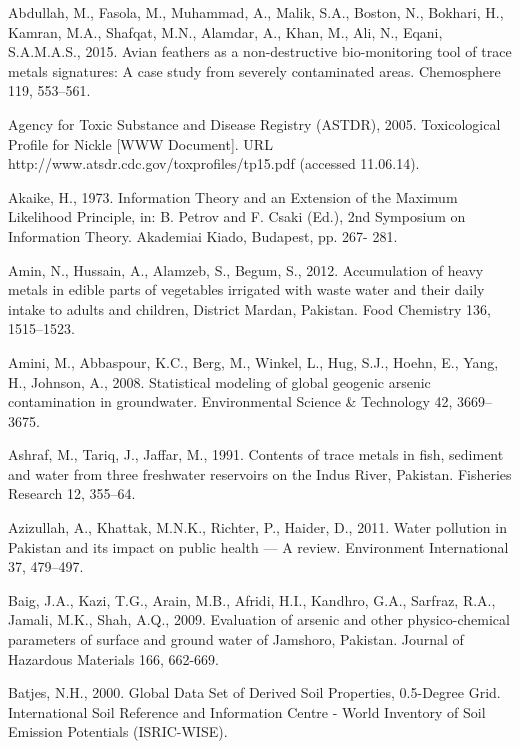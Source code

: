 \begin{thebibliography}

\bibitem{} \hangindent=1cm Abdullah, M., Fasola, M., Muhammad, A., Malik, S.A., Boston, N., Bokhari, H., Kamran, M.A., Shafqat, M.N., Alamdar, A., Khan, M., Ali, N., Eqani, S.A.M.A.S., 2015. Avian feathers as a non-destructive bio-monitoring tool of trace metals signatures: A case study from severely contaminated areas. Chemosphere 119, 553–561.

\bibitem{} \hangindent=1cm Agency for Toxic Substance and Disease Registry (ASTDR), 2005. Toxicological Profile for Nickle [WWW Document]. URL http://www.atsdr.cdc.gov/toxprofiles/tp15.pdf (accessed 11.06.14).

\bibitem{} \hangindent=1cm Akaike, H., 1973. Information Theory and an Extension of the Maximum Likelihood Principle, in: B. Petrov and F. Csaki (Ed.), 2nd Symposium on Information Theory. Akademiai Kiado, Budapest, pp. 267- 281.

\bibitem{} \hangindent=1cm Amin, N., Hussain, A., Alamzeb, S., Begum, S., 2012. Accumulation of heavy metals in edible parts of vegetables irrigated with waste water and their daily intake to adults and children, District Mardan, Pakistan. Food Chemistry 136, 1515–1523. 

\bibitem{} \hangindent=1cm Amini, M., Abbaspour, K.C., Berg, M., Winkel, L., Hug, S.J., Hoehn, E., Yang, H., Johnson, A., 2008. Statistical modeling of global geogenic arsenic contamination in groundwater. Environmental Science \& Technology 42, 3669–3675.

\bibitem{} \hangindent=1cm Ashraf, M., Tariq, J., Jaffar, M., 1991. Contents of trace metals in fish, sediment and water from three freshwater reservoirs on the Indus River, Pakistan. Fisheries Research 12, 355–64.

\bibitem{} \hangindent=1cm Azizullah, A., Khattak, M.N.K., Richter, P., Haider, D., 2011. Water pollution in Pakistan and its impact on public health — A review. Environment International 37, 479–497.

\bibitem{} \hangindent=1cm Baig, J.A., Kazi, T.G., Arain, M.B., Afridi, H.I., Kandhro, G.A., Sarfraz, R.A., Jamali, M.K., Shah, A.Q., 2009. Evaluation of arsenic and other physico-chemical parameters of surface and ground water of Jamshoro, Pakistan. Journal of Hazardous Materials 166, 662-669.

\bibitem{} \hangindent=1cm Batjes, N.H., 2000. Global Data Set of Derived Soil Properties, 0.5-Degree Grid. International Soil Reference and Information Centre - World Inventory of Soil Emission Potentials (ISRIC-WISE).


\end{thebibliography}

